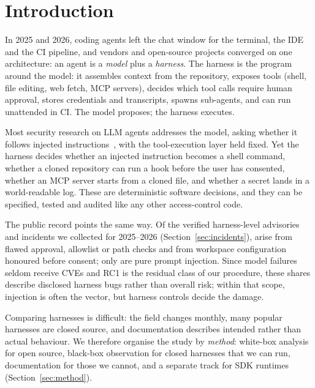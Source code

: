 \section{Introduction}\label{sec:intro}

In 2025 and 2026, coding agents left the chat window for the terminal, the IDE and the CI pipeline, and vendors and open-source projects converged on one architecture: an agent is a \emph{model} plus a \emph{harness}. The harness is the program around the model: it assembles context from the repository, exposes tools (shell, file editing, web fetch, MCP servers), decides which tool calls require human approval, stores credentials and transcripts, spawns sub-agents, and can run unattended in CI. The model proposes; the harness executes.

Most security research on LLM agents addresses the model, asking whether it follows injected instructions~\cite{greshake2023,agentdojo,injecagent}, with the tool-execution layer held fixed. Yet the harness decides whether an injected instruction becomes a shell command, whether a cloned repository can run a hook before the user has consented, whether an MCP server starts from a cloned file, and whether a secret lands in a world-readable log. These are deterministic software decisions, and they can be specified, tested and audited like any other access-control code.

The public record points the same way. Of the \nIncCounted{} verified harness-level advisories and incidents we collected for 2025--2026 (Section~\ref{sec:incidents}), \nIncRCThree{} arise from flawed approval, allowlist or path checks and \nIncRCTwo{} from workspace configuration honoured before consent; only \nIncRCOne{} are pure prompt injection. Since model failures seldom receive CVEs and RC1 is the residual class of our procedure, these shares describe disclosed harness bugs rather than overall risk; within that scope, injection is often the vector, but harness controls decide the damage.

Comparing harnesses is difficult: the field changes monthly, many popular harnesses are closed source, and documentation describes intended rather than actual behaviour. We therefore organise the study by \emph{method}: white-box analysis for open source, black-box observation for closed harnesses that we can run, documentation for those we cannot, and a separate track for SDK runtimes (Section~\ref{sec:method}).


